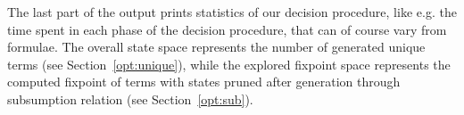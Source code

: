 The last part of the output prints statistics of our decision procedure, like e.g. the
time spent in each phase of the decision procedure, that can of course vary from formulae.
The overall state space represents the number of generated unique terms 
(see Section~\ref{opt:unique}), while the explored fixpoint space represents the computed
fixpoint of terms with states pruned after generation through subsumption relation 
(see Section~\ref{opt:sub}).
 
%

